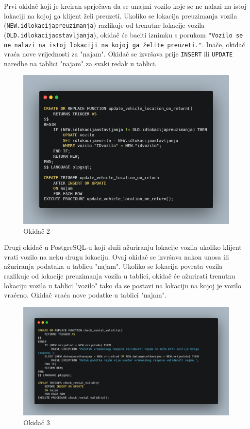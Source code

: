 \documentclass[]{foi} %
\begin{document}
Prvi okidač koji je kreiran sprječava da se unajmi vozilo koje se ne nalazi na istoj lokaciji na kojoj ga klijent želi preuzeti. Ukoliko se lokacija preuzimanja vozila (\texttt{NEW.idlokacijapreuzimanja}) razlikuje od trenutne lokacije vozila  (\texttt{OLD.idlokacijaostavljanja}), okidač će baciti iznimku s porukom \texttt{"Vozilo se ne nalazi na istoj lokaciji na kojoj ga želite preuzeti."}. Inače, okidač vraća nove vrijednosti za "najam". Okidač se izvršava prije \texttt{INSERT} ili \texttt{UPDATE} naredbe na tablici "najam" za svaki redak u tablici.
\newpage

\begin{figure}[!ht]
    \centering
    \includegraphics[width=1\textwidth]{slike/2.png}
    \caption{Okidač 2}
    \label{fig:drugi}
\end{figure}

Drugi okidač u PostgreSQL-u koji služi ažuriranju lokacije vozila ukoliko klijent vrati vozilo na neku drugu lokaciju. Ovaj okidač se izvršava nakon unosa ili ažuriranja podataka u tablicu "najam". Ukoliko se lokacija povrata vozila razlikuje od lokacije preuzimanja vozila u tablici, okidač će ažurirati trenutnu lokaciju vozila u tablici "vozilo" tako da se postavi na lokaciju na kojoj je vozilo vraćeno. Okidač vraća nove podatke u tablici "najam".
\newpage

\begin{figure}[!ht]
    \centering
    \includegraphics[width=1\textwidth]{slike/3.png}
    \caption{Okidač 3}
    \label{fig:treci}
\end{figure}
\end{document}
